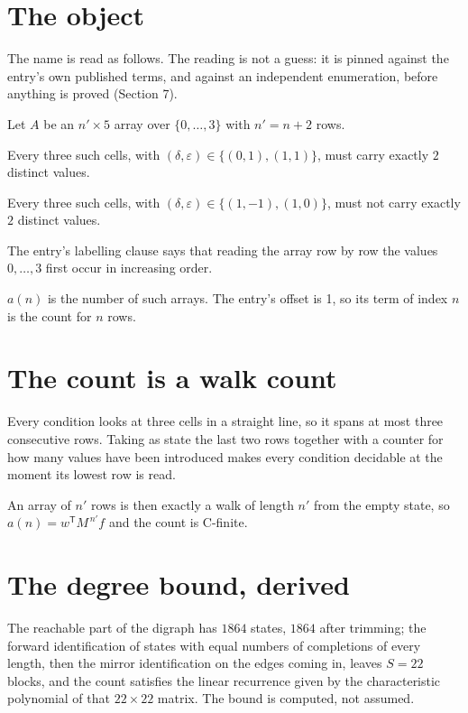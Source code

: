 \documentclass[11pt]{article}
\theoremstyle{definition}
\begin{document}
\section{The object}

The name is read as follows. The reading is not a guess: it is pinned against the entry's own published terms, and against an independent enumeration, before anything is proved (Section 7).

Let $A$ be an $n' \times 5$ array over $\{0,\dots,3\}$ with $n' = n + 2$ rows.

Every three such cells, with $(\delta,\varepsilon) \in \{(0,1), (1,1)\}$, must carry exactly $2$ distinct values.

Every three such cells, with $(\delta,\varepsilon) \in \{(1,-1), (1,0)\}$, must not carry exactly $2$ distinct values.

The entry's labelling clause says that reading the array row by row the values $0,\dots,3$ first occur in increasing order.

$a(n)$ is the number of such arrays. The entry's offset is 1, so its term of index $n$ is the count for $n$ rows.

\section{The count is a walk count}

Every condition looks at three cells in a straight line, so it spans at most three consecutive rows. Taking as state the last two rows together with a counter for how many values have been introduced makes every condition decidable at the moment its lowest row is read.

An array of $n'$ rows is then exactly a walk of length $n'$ from the empty state, so $a(n) = w^{\mathsf T}M^{\,n'}f$ and the count is C-finite.

\section{The degree bound, derived}

The reachable part of the digraph has $1864$ states, $1864$ after trimming; the forward identification of states with equal numbers of completions of every length, then the mirror identification on the edges coming in, leaves $S = 22$ blocks, and the count satisfies the linear recurrence given by the characteristic polynomial of that $22\times22$ matrix. The bound is computed, not assumed.
\end{document}
